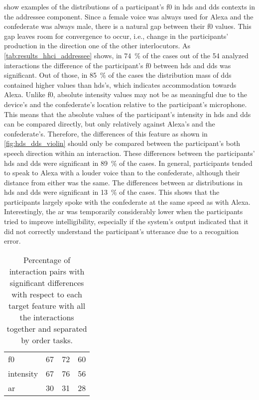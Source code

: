  show examples of the distributions of a participant's \ac{f0} in \ac{hds} and \ac{dds} contexts in the addressee component.
Since a female voice was always used for Alexa and the confederate was always male, there is a natural gap between their \ac{f0} values.
This gap leaves room for convergence to occur, i.e., change in the participants' production in the direction one of the other interlocutors.
As \cref{tab:results_hhci_addressee} shows, in \SI{74}{\percent} of the cases out of the 54 analyzed interactions the difference of the participant's \ac{f0} between \ac{hds} and \ac{dds} was significant.
Out of those, in \SI{85}{\percent} of the cases the distribution mass of \ac{dds} contained higher values than \ac{hds}'s, which indicates accommodation towards Alexa.
Unlike \ac{f0}, absolute intensity values may not be as meaningful due to the device's and the confederate's location relative to the participant's microphone.
This means that the absolute values of the participant's intensity in \ac{hds} and \ac{dds} can be compared directly, but only relatively against Alexa's and the confederate's.
Therefore, the differences of this feature as shown in \cref{fig:hds_dds_violin} should only be compared between the participant's both speech direction within an interaction.
These differences between the participants' \ac{hds} and \ac{dds} were significant in \SI{89}{\percent} of the cases.
In general, participants tended to speak to Alexa with a louder voice than to the confederate, although their distance from either was the same.
The differences between \ac{ar} distributions in \ac{hds} and \ac{dds} were significant in \SI{13}{\percent} of the cases.
This shows that the participants largely spoke with the confederate at the same speed as with Alexa.
Interestingly, the \ac{ar} was temporarily considerably lower when the participants tried to improve intelligibility, especially if the system's output indicated that it did not correctly understand the participant's utterance due to a recognition error.
%
\begin{table}
	\centering
	\caption[Percentage of significantly different interaction pairs in addressee component]
		{Percentage of interaction pairs with significant differences with respect to each target feature with all the interactions together and separated by order tasks.}
	\label{tab:signif_conditions}
	\begin{tabularx}{\linewidth}{XSSS}
		\toprule
		 & {} & {}	& {}\\
		\midrule
		\acs{f0}	& 67	& 72	& 60 \\
		intensity 	& 67	& 76	& 56 \\
		\acs{ar}	& 30	& 31	& 28 \\
		\bottomrule	
	\end{tabularx}
\end{table}
